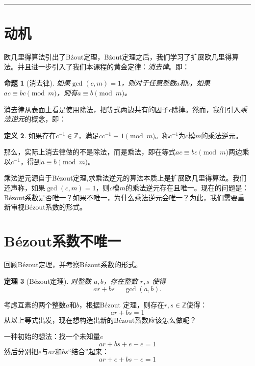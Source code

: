 \documentclass[12pt,a4paper]{ctexart}
\title{\vspace{-1.2cm}\textbf{\CourseTitle}}
\author{\AuthorName}
\date{\Term}
\theoremstyle{plain}
\newtheorem{theorem}{定理}[section]
\newtheorem{proposition}[theorem]{命题}
\theoremstyle{definition}
\newtheorem{definition}[theorem]{定义}
\theoremstyle{remark}
\begin{document}
\maketitle
\tableofcontents
\vspace{0.8em}
\hrule
\vspace{1em}

\section{动机}
欧几里得算法引出了B\'zout定理，B\'zout定理之后，我们学习了扩展欧几里得算法。并且进一步引入了我们本课程的黄金定律：\emph{消去律}。即：
\begin{proposition}[消去律]
\label{prop:cancel}
如果$\gcd(c, m) = 1$，则对于任意整数$a$和$b$，如果$ac \equiv bc \pmod{m}$，则有$a \equiv b \pmod{m}$。
\end{proposition}

消去律从表面上看是使用除法，把等式两边共有的因子$c$除掉。然而，我们引入\emph{乘法逆元}的概念，即：
\begin{definition}
\label{def:inverse}
如果存在$c^{-1}\in \mathbb{Z}$，满足$c c^{-1} \equiv 1 \pmod{m}$。称$c^{-1}$为$c$模$m$的乘法逆元。
\end{definition}
那么，实际上消去律做的不是除法，而是乘法，即在等式$ac \equiv bc \pmod{m}$两边乘以$c^{-1}$，得到$a \equiv b \pmod{m}$。

乘法逆元源自于B\'ezout定理,求乘法逆元的算法本质上是扩展欧几里得算法。我们还声称，如果$\gcd(c, m) = 1$，则$c$模$m$的乘法逆元存在且唯一。现在的问题是：B\'ezout系数是否唯一？如果不唯一，为什么乘法逆元会唯一？为此，我们需要重新审视B\'ezout系数的形式。

\section{B\'ezout系数不唯一}
回顾B\'ezout定理，并考察B\'ezout系数的形式。
\begin{theorem}[B\'ezout定理]
\label{thm:bezout}
对整数 $a,b$，存在整数 $r,s$ 使得
\[ar+bs=\gcd(a,b).
\]\end{theorem}


考虑互素的两个整数$a$和$b$，根据B\'ezout 定理，则存在$r, s \in \mathbb{Z}$使得：
	\[ar + b s = 1\]
从以上等式出发，现在想构造出新的B\'ezout系数应该怎么做呢？

一种初始的想法：找一个未知量$e$
		\[ a r + bs + e - e = 1\]
然后分别把$e$与$ar$和$bs$“结合”起来：
\begin{equation}
\label{eq:init}
  ar + e + bs -e = 1
\end{equation}
\end{document}
